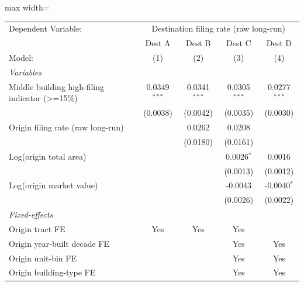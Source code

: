 \documentclass[
  11pt,
]{article}
\begin{document}
\begin{adjustbox}{max width=\textwidth}
\begingroup
\centering
\begin{tabular}{lcccc}
   \tabularnewline \midrule \midrule
   Dependent Variable: & \multicolumn{4}{c}{Destination filing rate (raw long-run)}\\
                                                   & Dest A         & Dest B         & Dest C         & Dest D \\   
   Model:                                          & (1)            & (2)            & (3)            & (4)\\  
   \midrule
   \emph{Variables}\\
   Middle building high-filing indicator (>=15\%)  & 0.0349$^{***}$ & 0.0341$^{***}$ & 0.0305$^{***}$ & 0.0277$^{***}$\\   
                                                   & (0.0038)       & (0.0042)       & (0.0035)       & (0.0030)\\   
   Origin filing rate (raw long-run)               &                & 0.0262         & 0.0208         &   \\   
                                                   &                & (0.0180)       & (0.0161)       &   \\   
   Log(origin total area)                          &                &                & 0.0026$^{*}$   & 0.0016\\   
                                                   &                &                & (0.0013)       & (0.0012)\\   
   Log(origin market value)                        &                &                & -0.0043        & -0.0040$^{*}$\\   
                                                   &                &                & (0.0026)       & (0.0022)\\   
   \midrule
   \emph{Fixed-effects}\\
   Origin tract FE                                 & Yes            & Yes            & Yes            & \\  
   Origin year-built decade FE                     &                &                & Yes            & Yes\\  
   Origin unit-bin FE                              &                &                & Yes            & Yes\\  
   Origin building-type FE                         &                &                & Yes            & Yes\\  

\end{tabular}
\end{adjustbox}
\end{document}
